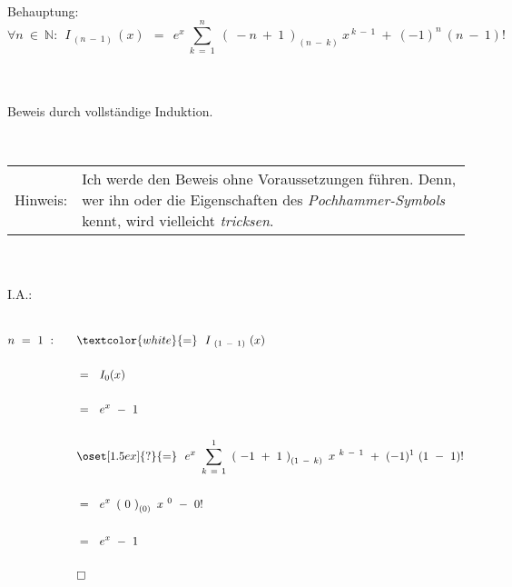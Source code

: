 	~\\
	
	\newpage
	
	Behauptung: \\
	
	\[ \forall n ~ \in ~ \mathbb{N}: ~~ I_{~ (n ~ - ~ 1) ~} (x) ~~ = ~~ e^x ~ \sum_{k ~ = ~ 1}^{n} ~ \left( ~ -n ~ + ~ 1 ~ \right)_{(n ~ - ~ k)} ~ x^{~ k ~ - ~ 1} ~ + ~ (-1)^n ~ (n ~ - ~ 1)! \]
	
	~\\
	~\\
	
	Beweis durch vollständige Induktion.
	
	~\\
	
	\begin{tabularx}{\textwidth}{rX}
		
		Hinweis:  & Ich werde den Beweis ohne Voraussetzungen führen. Denn, wer ihn oder die Eigenschaften des \textit{Pochhammer-Symbols} kennt, wird vielleicht \textit{tricksen}. \\
		
	\end{tabularx}
	
	~\\
	~\\
	
	I.A.:
	
	~\\
	
$\begin{aligned}[t]
	n ~ = ~ 1 ~ : \qquad &\textcolor{white}{=} ~~ I_{~ (1 ~ - ~ 1) ~} (x) \\ \\
	&= ~~ I_0(x) \\ \\
	&= ~~ e^x ~ - ~ 1 \\ \\
	&\oset[1.5ex]{?}{=} ~~ e^x ~ \sum_{k ~ = ~ 1}^{1} ~ \left( ~ -1 ~ + ~ 1 ~ \right)_{(1 ~ - ~ k)} ~ x^{~ k ~ - ~ 1} ~ + ~ (-1)^1 ~ (1 ~ - ~ 1)! \\ \\
	&= ~~ e^x ~ \left( ~ 0 ~ \right)_{(0)} ~ x^{~ 0} ~ - ~ 0! \\ \\
	&= ~~ e^x ~ - ~ 1 \\ \\
	&\square
\end{aligned}$

	\newpage
	
